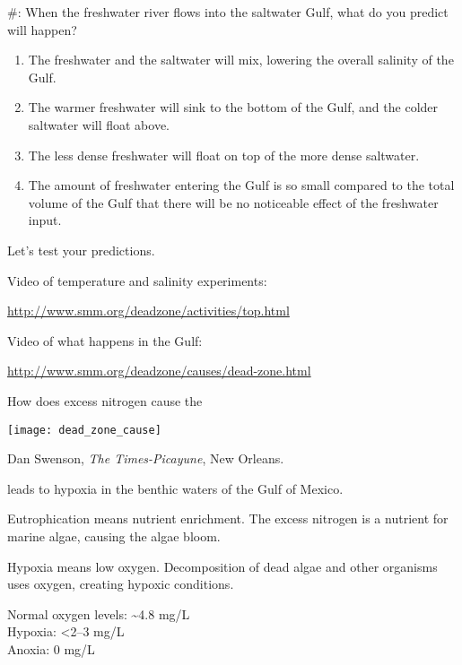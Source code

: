 \documentclass[t]{beamer}
\newcommand*{\cq}[1]{%
	\#{\lining#1}:%
}
\begin{document}
%
\begin{frame}{\cq{6} When the freshwater river flows into the saltwater Gulf, what do you predict will happen?}

	\begin{enumerate}
		\item The freshwater and the saltwater will mix, lowering the overall salinity of the Gulf.
	
		\item The warmer freshwater will sink to the bottom of the Gulf, and the colder saltwater will float above.

		\item The less dense freshwater will float on top of the more dense saltwater.
		
		\item The amount of freshwater entering the Gulf is so small compared to the total volume of the Gulf that there will be no noticeable effect of the freshwater input.
	\end{enumerate}
	
\end{frame}
%

\begin{frame}{Let's test your predictions.}

	\hangpara Video of temperature and salinity experiments:\bigskip
	
	\url{http://www.smm.org/deadzone/activities/top.html} \bigskip\bigskip
	
	\hangpara Video of what happens in the Gulf:\vspace*{\baselineskip}
	
	\url{http://www.smm.org/deadzone/causes/dead-zone.html}

	
\end{frame}
%

\begin{frame}{How does excess nitrogen cause the }

	{\centering \texttt{[image: dead\_zone\_cause]}\par
	}
	
	\vfilll
	
	\tiny Dan Swenson, \textit{The Times-Picayune}, New Orleans.	
\end{frame}
%
\begin{frame}{ leads to hypoxia in the benthic waters of the Gulf of Mexico.}

	\hangpara Eutrophication means nutrient enrichment. The excess nitrogen is a nutrient for marine algae, causing the algae bloom.
	
	\hangpara Hypoxia means low oxygen. Decomposition of dead algae and other organisms uses oxygen, creating hypoxic conditions.
	
	\hangpara Normal oxygen levels: \textasciitilde4.8 mg/L\\
	Hypoxia: \textless 2–3 mg/L\\
	Anoxia: 0 mg/L
\end{frame}
%
\end{document}
